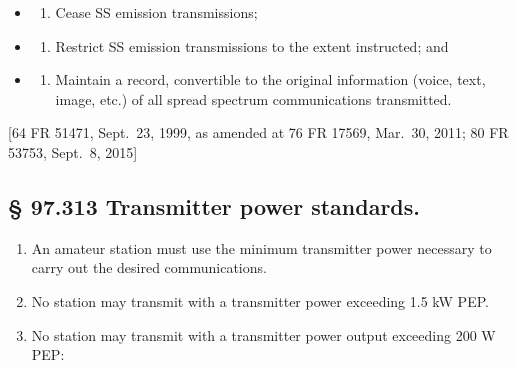 \documentclass[
  letterpaper,
  DIV=11,
  numbers=noendperiod]{scrreport}
\providecommand{\tightlist}{%
  \setlength{\itemsep}{0pt}\setlength{\parskip}{0pt}}\usepackage{longtable,booktabs,array}
\begin{document}
\begin{itemize}
\item
  \begin{enumerate}
  \def\labelenumi{(\arabic{enumi})}
  \tightlist
  \item
    Cease SS emission transmissions;
  \end{enumerate}
\item
  \begin{enumerate}
  \def\labelenumi{(\arabic{enumi})}
  \setcounter{enumi}{1}
  \tightlist
  \item
    Restrict SS emission transmissions to the extent instructed; and
  \end{enumerate}
\item
  \begin{enumerate}
  \def\labelenumi{(\arabic{enumi})}
  \setcounter{enumi}{2}
  \tightlist
  \item
    Maintain a record, convertible to the original information (voice,
    text, image, etc.) of all spread spectrum communications
    transmitted.
  \end{enumerate}
\end{itemize}

{[}64 FR 51471, Sept.~23, 1999, as amended at 76 FR 17569, Mar.~30,
2011; 80 FR 53753, Sept.~8, 2015{]}

\hypertarget{97.313}{%
\subsection*{§ 97.313 Transmitter power standards.}\label{97.313}}

\begin{enumerate}
\def\labelenumi{(\alph{enumi})}
\item
  An amateur station must use the minimum transmitter power necessary to
  carry out the desired communications.
\item
  No station may transmit with a transmitter power exceeding 1.5 kW PEP.
\item
  No station may transmit with a transmitter power output exceeding 200
  W PEP:
\end{enumerate}
\end{document}
